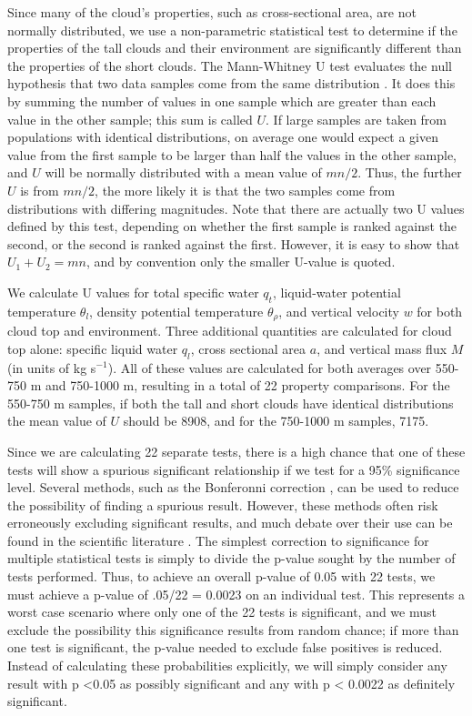 \documentclass[acp]{copernicus}
\begin{document}
Since many of the cloud's properties, such as cross-sectional area, are not 
normally distributed, we use a non-parametric statistical test to determine if 
the properties of the tall clouds and their environment are significantly 
different than the properties of the short clouds.  The Mann-Whitney U test 
evaluates the null hypothesis that two data samples come from the same 
distribution \citep{Mann1947}.  It does this by summing the number of values 
in one sample which are greater than each value in the other sample; this sum 
is called $U$.  If large samples are taken from populations with identical 
distributions, on average one would expect a given value from the first sample 
to be larger than half the values in the other sample, and $U$ will be normally 
distributed with a mean value of $mn/2$.  Thus, the further $U$ is from $mn/2$, 
the more likely it is that the two samples come from distributions with 
differing magnitudes.  Note that there are actually two U values defined by 
this test, depending on whether the first sample is ranked against the second, 
or the second is ranked against the first.  However, it is easy to show that 
$U_1 + U_2 = mn$, and by convention only the smaller U-value is quoted.

We calculate U values for total specific water $q_t$, liquid-water potential 
temperature $\theta_l$, density potential temperature $\theta_\rho$, and 
vertical velocity $w$ for both cloud top and environment.  Three additional 
quantities are calculated for cloud top alone: specific liquid water $q_l$, 
cross sectional area $a$, and vertical mass flux $M$ (in units of kg s$^{-1}$).  
All of these values are calculated for both averages over 550-750 m and 
750-1000 m, resulting in a total of 22 property comparisons.  For the 550-750 m 
samples, if both the tall and short clouds have identical distributions the 
mean value of $U$ should be 8908, and for the 750-1000 m samples, 7175.  

Since we are calculating 22 separate tests, there is a high chance that one of 
these tests will show a spurious significant relationship if we test for a 95\% 
significance level.  Several methods, such as the Bonferonni correction 
\citep{Shaffer1995}, can be used to reduce the possibility of finding a 
spurious result.  However, these methods often risk erroneously excluding 
significant results, and much debate over their use can be found in the 
scientific literature \citep{Perneger1998, Nakagawa2004}.  The simplest 
correction to significance for multiple statistical tests is simply to divide 
the p-value sought by the number of tests performed.  Thus, to achieve an 
overall p-value of 0.05 with 22 tests, we must achieve a p-value of .05/22 = 
0.0023 on an individual test. This represents a worst case scenario where only 
one of the 22 tests is significant, and we must exclude the possibility this 
significance results from random chance; if more than one test is significant, 
the p-value needed to exclude false positives is reduced.  Instead of 
calculating these probabilities explicitly, we will simply consider any result 
with p \textless 0.05 as possibly significant and any with p \textless 
0.0022 as definitely significant.  
\end{document}
